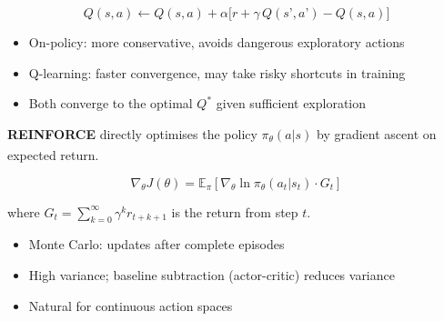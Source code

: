 \begin{tcbitemize}[ skin=sectionraster ]
    \begin{equation}
        Q(s,a) \leftarrow Q(s,a) + \alpha\bigl[r + \gamma\,Q(s’,a’) - Q(s,a)\bigr]
    \end{equation}

    \begin{itemize}
        \item On-policy: more conservative, avoids dangerous exploratory actions
        \item Q-learning: faster convergence, may take risky shortcuts in training
        \item Both converge to the optimal $Q^*$ given sufficient exploration
    \end{itemize}

    \tcbitem[title=REINFORCE (Policy Gradient), raster multicolumn=3]
    \textbf{REINFORCE} directly optimises the policy $\pi_\theta(a|s)$ by
    gradient ascent on expected
    return.\textsuperscript{\cite[][Ch.~13]{suttonReinforcementLearningIntroduction2018}}

    \begin{equation}
        \nabla_\theta J(\theta) = \mathbb{E}_\pi\!\left[
            \nabla_\theta \ln \pi_\theta(a_t|s_t) \cdot G_t\right]
    \end{equation}

    where $G_t = \sum_{k=0}^{\infty} \gamma^k r_{t+k+1}$ is the return from step $t$.

    \begin{itemize}
        \item Monte Carlo: updates after complete episodes
        \item High variance; baseline subtraction (actor-critic) reduces variance
        \item Natural for continuous action spaces
    \end{itemize}

    \end{tcbitemize}

